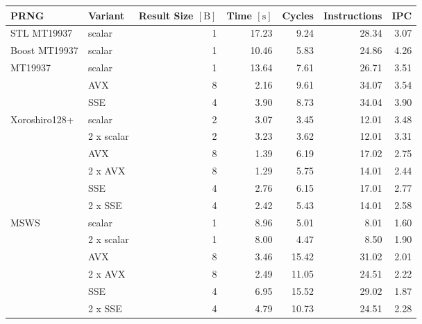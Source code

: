 \documentclass{stdlocal}
\begin{document}
\begin{tabular}{llrrrrr}
  \hline
  \textbf{PRNG} & \textbf{Variant} & \textbf{Result Size} $[\mathrm{B}]$ & \textbf{Time} $[\mathrm{s}]$ & \textbf{Cycles} & \textbf{Instructions} & \textbf{IPC} \\
  \hline
  \hline
  STL MT19937
  & scalar & 1 & 17.23 & 9.24 & 28.34 & 3.07 \\
  \hline
  Boost MT19937
  & scalar & 1 & 10.46 & 5.83 & 24.86 & 4.26 \\
  \hline
  \multirow{3}{*}{MT19937}
  & scalar & 1 & 13.64 & 7.61 & 26.71 & 3.51 \\
  & AVX & 8 & 2.16 & 9.61 & 34.07 & 3.54 \\
  & SSE & 4 & 3.90 & 8.73 & 34.04 & 3.90 \\
  \hline
  \multirow{6}{*}{Xoroshiro128+}
  & scalar & 2 & 3.07 & 3.45 & 12.01 & 3.48 \\
  & 2 x scalar & 2 & 3.23 & 3.62 & 12.01 & 3.31 \\
  & AVX & 8 & 1.39 & 6.19 & 17.02 & 2.75 \\
  & 2 x AVX & 8 & 1.29 & 5.75 & 14.01 & 2.44 \\
  & SSE & 4 & 2.76 & 6.15 & 17.01 & 2.77 \\
  & 2 x SSE & 4 & 2.42 & 5.43 & 14.01 & 2.58 \\
  \hline
  \multirow{6}{*}{MSWS}
  & scalar & 1 & 8.96 & 5.01 & 8.01 & 1.60 \\
  & 2 x scalar & 1 & 8.00 & 4.47 & 8.50 & 1.90 \\
  & AVX & 8 & 3.46 & 15.42 & 31.02 & 2.01 \\
  & 2 x AVX & 8 & 2.49 & 11.05 & 24.51 & 2.22 \\
  & SSE & 4 & 6.95 & 15.52 & 29.02 & 1.87 \\
  & 2 x SSE & 4 & 4.79 & 10.73 & 24.51 & 2.28 \\
  \hline
\end{tabular}
\end{document}
